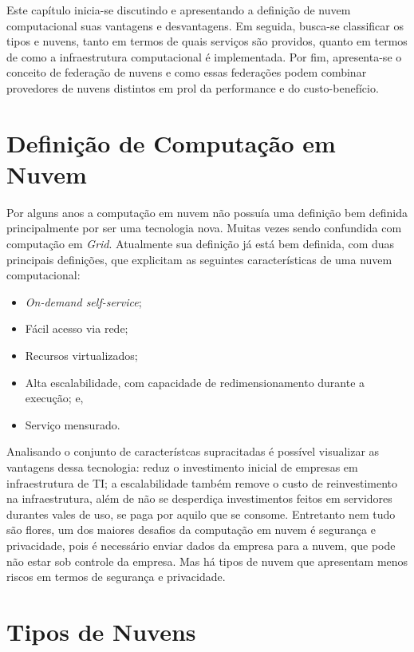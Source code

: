 Este capítulo inicia-se discutindo e apresentando a definição de nuvem computacional suas vantagens e desvantagens. Em seguida, busca-se classificar os tipos e nuvens, tanto em termos de quais serviços são providos, quanto em termos de como a infraestrutura computacional é implementada. Por fim, apresenta-se o conceito de federação de nuvens e como essas federações podem combinar provedores de nuvens distintos em prol da performance e do custo-benefício.

\section{Definição de Computação em Nuvem}

Por alguns anos a computação em nuvem não possuía uma definição bem definida principalmente por ser uma tecnologia nova. Muitas vezes sendo confundida com computação em \textit{Grid}. Atualmente sua definição já está bem definida, com duas principais definições\cite{NIST_CLOUD_DEFINITION}\cite{Vaquero:2008:BCT:1496091.1496100_Cloud_definition}, que explicitam as seguintes características de uma nuvem computacional: 

\begin{itemize}
	\item \textit{On-demand self-service};
	\item Fácil acesso via rede;
	\item Recursos virtualizados;
	\item Alta escalabilidade, com capacidade de redimensionamento durante a execução; e,
	\item Serviço mensurado.
\end{itemize}

Analisando o conjunto de característcas supracitadas é possível visualizar as vantagens dessa tecnologia: reduz o investimento inicial de empresas em infraestrutura de TI; a escalabilidade também remove o custo de reinvestimento na infraestrutura, além de não se desperdiça investimentos feitos em servidores durantes vales de uso, se paga por aquilo que se consome. Entretanto nem tudo são flores, um dos maiores desafios da computação em nuvem é segurança e privacidade, pois é necessário enviar dados da empresa para a nuvem, que pode não estar sob controle da empresa. Mas há tipos de nuvem que apresentam menos riscos em termos de segurança e privacidade.

\section{Tipos de Nuvens}

